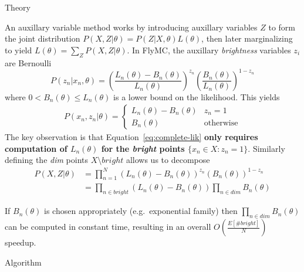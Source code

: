\documentclass[final]{beamer}
\newlength{\onecolwid}
\newlength{\twocolwid}
\begin{document}
\begin{frame}[t]
\begin{columns}[t]
\begin{column}{\twocolwid}
\begin{columns}[t,totalwidth=\twocolwid]
\begin{column}{\onecolwid}
\begin{block}{Theory}

An auxillary variable method works by introducing auxillary variables $Z$
to form the joint distribution $P(X,Z|\theta) = P(Z|X,\theta) L(\theta)$,
then later marginalizing to yield $L(\theta) = \sum_Z P(X,Z|\theta)$.
In FlyMC, the auxillary \emph{brightness} variables $z_i$ are Bernoulli
\begin{equation}
  \label{eq:brightness}
  P(z_n | x_n, \theta)
  = \left(
  \frac{L_n(\theta) - B_n(\theta)}{L_n(\theta)}
  \right)^{z_n} \left(
  \frac{B_n(\theta)}{L_n(\theta)}
  \right)^{1-z_n}
\end{equation}
where $0 < B_n(\theta) \leq L_n(\theta)$ is a lower bound on the likelihood.
This yields
\begin{align}
  \label{eq:complete-lik}
  P(x_n,z_n|\theta) = \begin{cases}
    L_n(\theta) - B_n(\theta) & z_n = 1\\
    B_n(\theta) & \text{otherwise}
  \end{cases}
\end{align}
The key observation is that Equation~\ref{eq:complete-lik} \textbf{only
requires computation of $L_n(\theta)$ for the \emph{bright} points $\{x_n \in
X : z_n = 1\}$}. Similarly defining the \emph{dim} points $X \setminus
bright$ allows us to decompose
\begin{align}
  \label{eq:complete-lik-all-data}
  P(X,Z|\theta)
  &= \prod_{n=1}^N (L_n(\theta) - B_n(\theta))^{z_n} (B_n(\theta))^{1 - z_n} \\
  &= \prod_{n \in bright} (L_n(\theta) - B_n(\theta)) \prod_{n \in dim} B_n(\theta)
\end{align}

If $B_n(\theta)$ is chosen appropriately (e.g.\ exponential family) then
$\prod_{n \in dim} B_n(\theta)$ can be computed in constant time, resulting in
an overall $O(\frac{E[\# bright]}{N})$ speedup.


\end{block}

\begin{block}{Algorithm}


\end{block}
\end{column}
\end{columns}
\end{column}
\end{columns}
\end{frame}
\end{document}
